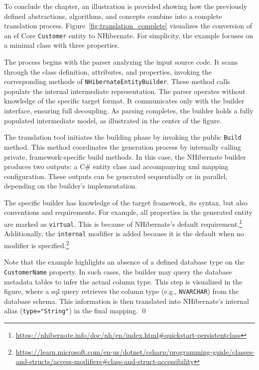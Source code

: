 \begin{example}
\small
To conclude the chapter, an illustration is provided showing how the previously defined abstractions, algorithms, and concepts combine into a complete translation process. Figure~\ref{fig:translation_complete} visualizes the conversion of an \acrshort{ef} Core \texttt{Customer} entity to NHibernate. For simplicity, the example focuses on a minimal class with three properties.

The process begins with the parser analyzing the input source code. It scans through the class definition, attributes, and properties, invoking the corresponding methods of \texttt{NHibernateEntityBuilder}. These method calls populate the internal intermediate representation. The parser operates without knowledge of the specific target format. It communicates only with the builder interface, ensuring full decoupling. As parsing completes, the builder holds a fully populated intermediate model, as illustrated in the center of the figure. 

The translation tool initiates the building phase by invoking the public \texttt{Build} method. This method coordinates the generation process by internally calling private, framework-specific build methods. In this case, the NHibernate builder produces two outputs: a C\# entity class and accompanying \acrshort{xml} mapping configuration. These outputs can be generated sequentially or in parallel, depending on the builder's implementation.

The specific builder has knowledge of the target framework, its syntax, but also conventions and requirements. For example, all properties in the generated entity are marked as \texttt{virtual}. This is because of NHibernate's default requirement.\footnote{\url{https://nhibernate.info/doc/nh/en/index.html\#quickstart-persistentclass}} Additionally, the \texttt{internal} modifier is added because it is the default when no modifier is specified.\footnote{\url{https://learn.microsoft.com/en-us/dotnet/csharp/programming-guide/classes-and-structs/access-modifiers\#class-and-struct-accessibility}}

Note that the example highlights an absence of a defined database type on the \texttt{CustomerName} property. In such cases, the builder may query the database metadata tables to infer the actual column type. This step is visualized in the figure, where a \acrshort{sql} query retrieves the column type (e.g., \texttt{NVARCHAR}) from the database schema. This information is then translated into NHibernate's internal alias (\texttt{type="String"}) in the final mapping.
\qed
\end{example}

